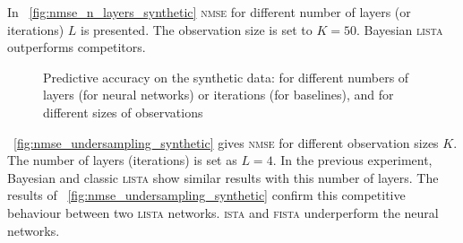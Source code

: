 \documentclass{article}
\begin{document}
  In \figurename~\ref{fig:nmse_n_layers_synthetic} \textsc{nmse} for different number of layers (or iterations) $L$ is presented. The observation size is set to $K=50$. Bayesian \textsc{lista} outperforms competitors.
  \begin{figure}[t]
  \centering
  \caption{Predictive accuracy on the synthetic data: for different numbers of layers (for neural networks) or iterations (for baselines), and for different sizes of observations}
  \label{fig:number_of_layers_synthetic}
  \end{figure}
   \figurename~\ref{fig:nmse_undersampling_synthetic} gives \textsc{nmse} for different observation sizes $K$. The number of layers (iterations) is set as $L=4$. In the previous experiment, Bayesian and classic \textsc{lista} show similar results with this number of layers. The results of \figurename~\ref{fig:nmse_undersampling_synthetic} confirm this competitive behaviour between two \textsc{lista} networks. \textsc{ista} and \textsc{fista} underperform the neural networks. %
  
\end{document}
